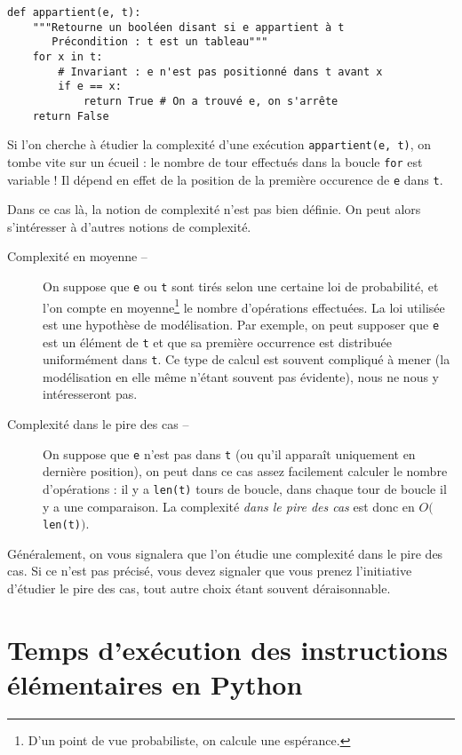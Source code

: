 \begin{lstlisting}
def appartient(e, t):
    """Retourne un booléen disant si e appartient à t
       Précondition : t est un tableau"""
    for x in t:
        # Invariant : e n'est pas positionné dans t avant x
        if e == x:
            return True # On a trouvé e, on s'arrête
    return False
\end{lstlisting}

Si l'on cherche à étudier la complexité d'une exécution \texttt{appartient(e, t)}, on tombe vite sur un écueil : le nombre de tour effectués dans la boucle \texttt{for} est variable ! 
Il dépend en effet de la position de la première occurence de \texttt{e} dans \texttt{t}. 

Dans ce cas là, la notion de complexité n'est pas bien définie. On peut alors s'intéresser à d'autres notions de complexité. 

\begin{description}
  \item[Complexité en moyenne --] On suppose que \texttt{e} ou \texttt{t} sont tirés selon une certaine loi 
de probabilité, et l'on compte \og en moyenne\footnote{D'un point de vue probabiliste, on calcule une 
espérance.} \fg{} le nombre d'opérations effectuées. 
    La loi utilisée est une hypothèse de modélisation. Par exemple, on peut supposer que \texttt{e} est un élément de \texttt{t} et que sa première occurrence est distribuée uniformément dans \texttt{t}. 
    Ce type de calcul est souvent compliqué à mener (la modélisation en elle même n'étant souvent pas évidente), nous ne nous y intéresseront pas. 
  \item[Complexité dans le pire des cas --] On suppose que \texttt{e} n'est pas dans \texttt{t} (ou qu'il apparaît uniquement en dernière position), on peut dans ce cas assez facilement calculer le nombre d'opérations : 
    il y a \texttt{len(t)} tours de boucle, dans chaque tour de boucle il y a une comparaison. La complexité \emph{dans le pire des cas} est donc en $O($\texttt{len(t)}$)$.
\end{description}

Généralement, on vous signalera que l'on étudie une complexité dans le pire des cas. Si ce n'est pas précisé, vous devez signaler que vous prenez l'initiative d'étudier le pire des cas, tout autre choix étant souvent déraisonnable. 

\section{Temps d'exécution des instructions élémentaires en Python}

